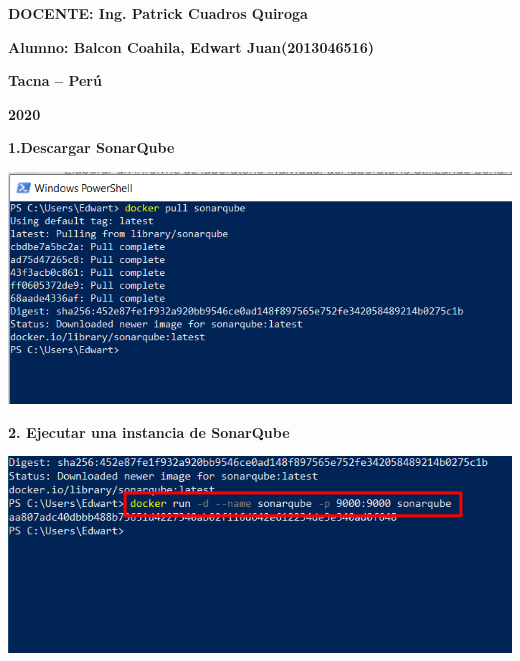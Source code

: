 \documentclass{article}
\begin{document}
\begin{titlepage}
\begin{center}
\vspace*{0.3in}
\begin{Large}
\textbf{DOCENTE: Ing. Patrick Cuadros Quiroga} \\
\end{Large}

\vspace*{0.2in}
\vspace*{0.1in}
\begin{large}

\begin{Large}
\textbf{Alumno: Balcon Coahila, Edwart Juan\hfill	(2013046516) } \\
\end{Large}

\vspace*{0.15in}
\begin{Large}
\textbf{Tacna – Perú} \\
\end{Large}

\vspace*{0.05in}
\begin{Large}
\textbf{2020 } \\
\end{Large}

\end{large}
\end{center}

\end{titlepage}


\newpage


\textbf{1.Descargar SonarQube}

    \begin{center}
		\includegraphics[width=15cm]{./images/1} 
	\end{center}

\textbf{2. Ejecutar una instancia de SonarQube}

    \begin{center}
		\includegraphics[width=15cm]{./images/2} 
	\end{center}
  
\end{document}
